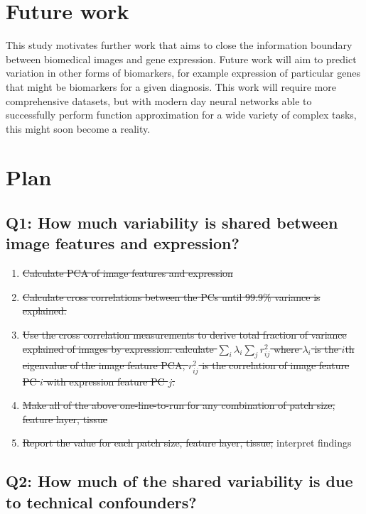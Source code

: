 \documentclass{article}
\begin{document}
\section{Future work}
This study motivates further work that aims to close the information boundary between biomedical images and gene expression. Future work will aim to predict variation in other forms of biomarkers, for example expression of particular genes that might be biomarkers for a given diagnosis. This work will require more comprehensive datasets, but with modern day neural networks able to successfully perform function approximation for a wide variety of complex tasks, this might soon become a reality. 


\section*{Plan}

\subsection*{Q1: How much variability is shared between image features and expression?} 
\begin{enumerate}
\item \sout{Calculate PCA of image features and expression}

\item \sout{Calculate cross correlations between the PCs until 99.9\% variance is explained.}

\item \sout{Use the cross correlation measurements to derive total fraction of variance explained of images by expression: calculate $\sum_i \lambda_i \sum_j r^2_{ij} $ where $\lambda_i$ is the $i$th eigenvalue of the image feature PCA, $r^2_{ij}$ is the correlation of image feature PC $i$ with expression feature PC $j$.}

\item \sout{Make all of the above one-line-to-run for any combination of patch size, feature layer, tissue}

\item \sout{Report the value for each patch size, feature layer, tissue;} interpret findings

\end{enumerate}

\subsection*{Q2: How much of the shared variability is due to technical confounders?} 
\end{document}
